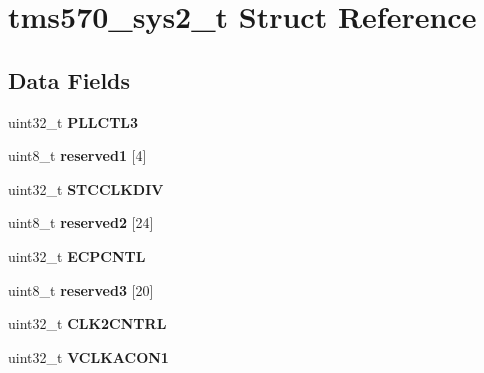 \hypertarget{structtms570__sys2__t}{}\section{tms570\+\_\+sys2\+\_\+t Struct Reference}
\label{structtms570__sys2__t}
\subsection*{Data Fields}
\begin{DoxyCompactItemize}
\item 
\mbox{\label{structtms570__sys2__t_a15d2566b8976ddcd9100a61280935959}} 
uint32\+\_\+t {\bfseries P\+L\+L\+C\+T\+L3}
\item 
\mbox{\label{structtms570__sys2__t_a81958baaf134a2e384513d432aeade54}} 
uint8\+\_\+t {\bfseries reserved1} \mbox{[}4\mbox{]}
\item 
\mbox{\label{structtms570__sys2__t_adfcc80070f312a204f2d5c21a396e151}} 
uint32\+\_\+t {\bfseries S\+T\+C\+C\+L\+K\+D\+IV}
\item 
\mbox{\label{structtms570__sys2__t_a0703cb1282f8278db880f3f563d360d1}} 
uint8\+\_\+t {\bfseries reserved2} \mbox{[}24\mbox{]}
\item 
\mbox{\label{structtms570__sys2__t_a4bf20d5f320ac5fb239a38c3aa477606}} 
uint32\+\_\+t {\bfseries E\+C\+P\+C\+N\+TL}
\item 
\mbox{\label{structtms570__sys2__t_aad7d4f6f175a47ec4089813a3a5ab7ba}} 
uint8\+\_\+t {\bfseries reserved3} \mbox{[}20\mbox{]}
\item 
\mbox{\label{structtms570__sys2__t_a16fe76d9af53f96bb7fd026f0031a009}} 
uint32\+\_\+t {\bfseries C\+L\+K2\+C\+N\+T\+RL}
\item 
\mbox{\label{structtms570__sys2__t_ae62ee8bdff7d13f7f8aaebdcab64e8ad}} 
uint32\+\_\+t {\bfseries V\+C\+L\+K\+A\+C\+O\+N1}
\item 
\mbox{\label{structtms570__sys2__t_a7931a2341a6adb1ba4e5cdcdc4bac414}} 

\end{DoxyCompactItemize}

